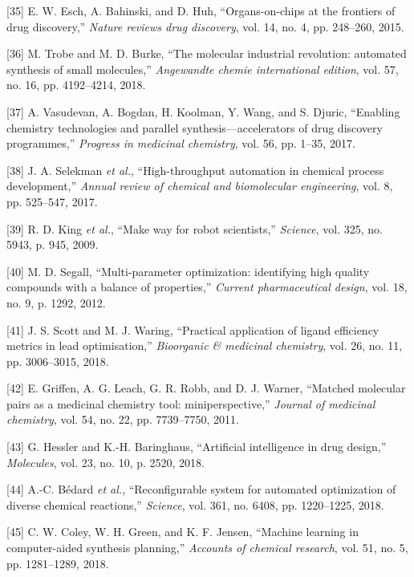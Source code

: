 \documentclass[11pt]{article}
\begin{document}
\hypertarget{citeproc_bib_item_35}{[35] E. W. Esch, A. Bahinski, and D. Huh, “Organs-on-chips at the frontiers of drug discovery,” \textit{Nature reviews drug discovery}, vol. 14, no. 4, pp. 248–260, 2015.}

\hypertarget{citeproc_bib_item_36}{[36] M. Trobe and M. D. Burke, “The molecular industrial revolution: automated synthesis of small molecules,” \textit{Angewandte chemie international edition}, vol. 57, no. 16, pp. 4192–4214, 2018.}

\hypertarget{citeproc_bib_item_37}{[37] A. Vasudevan, A. Bogdan, H. Koolman, Y. Wang, and S. Djuric, “Enabling chemistry technologies and parallel synthesis—accelerators of drug discovery programmes,” \textit{Progress in medicinal chemistry}, vol. 56, pp. 1–35, 2017.}

\hypertarget{citeproc_bib_item_38}{[38] J. A. Selekman \textit{et al.}, “High-throughput automation in chemical process development,” \textit{Annual review of chemical and biomolecular engineering}, vol. 8, pp. 525–547, 2017.}

\hypertarget{citeproc_bib_item_39}{[39] R. D. King \textit{et al.}, “Make way for robot scientists,” \textit{Science}, vol. 325, no. 5943, p. 945, 2009.}

\hypertarget{citeproc_bib_item_40}{[40] M. D. Segall, “Multi-parameter optimization: identifying high quality compounds with a balance of properties,” \textit{Current pharmaceutical design}, vol. 18, no. 9, p. 1292, 2012.}

\hypertarget{citeproc_bib_item_41}{[41] J. S. Scott and M. J. Waring, “Practical application of ligand efficiency metrics in lead optimisation,” \textit{Bioorganic \& medicinal chemistry}, vol. 26, no. 11, pp. 3006–3015, 2018.}

\hypertarget{citeproc_bib_item_42}{[42] E. Griffen, A. G. Leach, G. R. Robb, and D. J. Warner, “Matched molecular pairs as a medicinal chemistry tool: miniperspective,” \textit{Journal of medicinal chemistry}, vol. 54, no. 22, pp. 7739–7750, 2011.}

\hypertarget{citeproc_bib_item_43}{[43] G. Hessler and K.-H. Baringhaus, “Artificial intelligence in drug design,” \textit{Molecules}, vol. 23, no. 10, p. 2520, 2018.}

\hypertarget{citeproc_bib_item_44}{[44] A.-C. Bédard \textit{et al.}, “Reconfigurable system for automated optimization of diverse chemical reactions,” \textit{Science}, vol. 361, no. 6408, pp. 1220–1225, 2018.}

\hypertarget{citeproc_bib_item_45}{[45] C. W. Coley, W. H. Green, and K. F. Jensen, “Machine learning in computer-aided synthesis planning,” \textit{Accounts of chemical research}, vol. 51, no. 5, pp. 1281–1289, 2018.}
\end{document}
